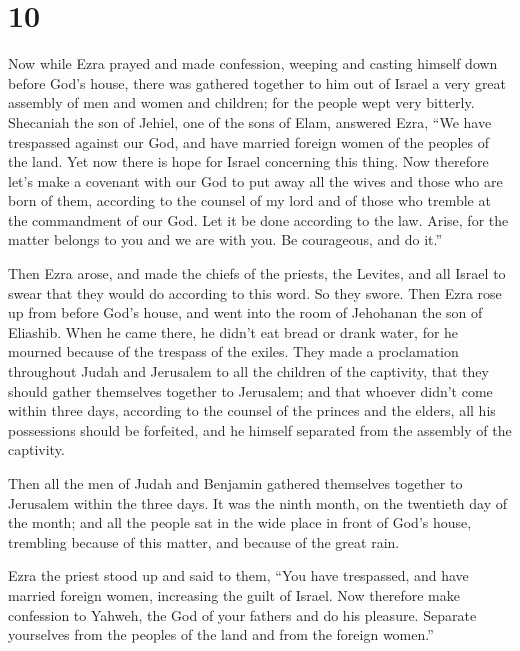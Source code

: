 \hypertarget{section-9}{%
\section{10}\label{section-9}}

 Now while Ezra prayed and made confession, weeping and
casting himself down before God's house, there was gathered together to
him out of Israel a very great assembly of men and women and children;
for the people wept very bitterly.  Shecaniah the son of
Jehiel, one of the sons of Elam, answered Ezra, ``We have trespassed
against our God, and have married foreign women of the peoples of the
land. Yet now there is hope for Israel concerning this thing.
 Now therefore let's make a covenant with our God to put
away all the wives and those who are born of them, according to the
counsel of my lord and of those who tremble at the commandment of our
God. Let it be done according to the law.  Arise, for the
matter belongs to you and we are with you. Be courageous, and do it.''

 Then Ezra arose, and made the chiefs of the priests, the
Levites, and all Israel to swear that they would do according to this
word. So they swore.  Then Ezra rose up from before God's
house, and went into the room of Jehohanan the son of Eliashib. When he
came there, he didn't eat bread or drank water, for he mourned because
of the trespass of the exiles.  They made a proclamation
throughout Judah and Jerusalem to all the children of the captivity,
that they should gather themselves together to Jerusalem; 
and that whoever didn't come within three days, according to the counsel
of the princes and the elders, all his possessions should be forfeited,
and he himself separated from the assembly of the captivity.

 Then all the men of Judah and Benjamin gathered
themselves together to Jerusalem within the three days. It was the ninth
month, on the twentieth day of the month; and all the people sat in the
wide place in front of God's house, trembling because of this matter,
and because of the great rain.

 Ezra the priest stood up and said to them, ``You have
trespassed, and have married foreign women, increasing the guilt of
Israel.  Now therefore make confession to Yahweh, the God
of your fathers and do his pleasure. Separate yourselves from the
peoples of the land and from the foreign women.''

